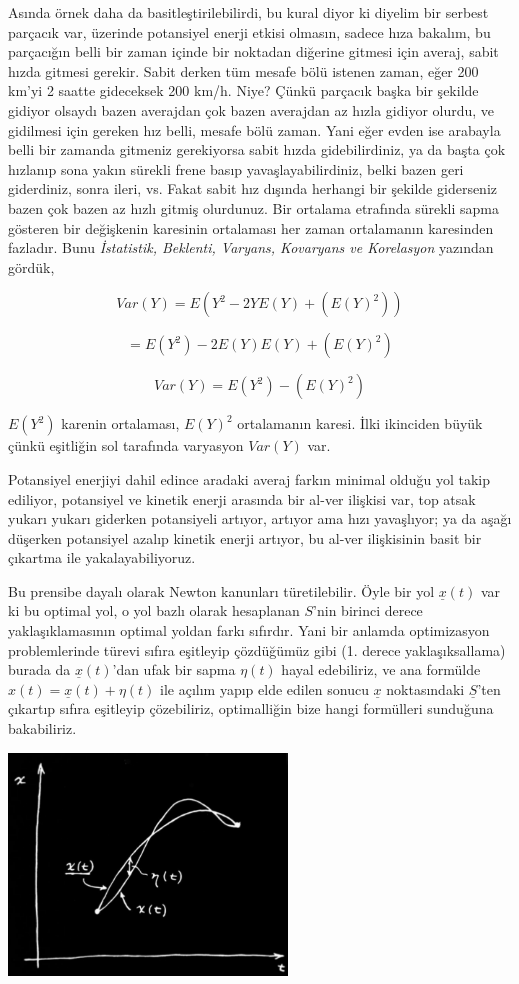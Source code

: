\documentclass[12pt,fleqn]{article}\usepackage{../../common}
\begin{document}
Asında örnek daha da basitleştirilebilirdi, bu kural diyor ki diyelim bir
serbest parçacık var, üzerinde potansiyel enerji etkisi olmasın, sadece
hıza bakalım, bu parçacığın belli bir zaman içinde bir noktadan diğerine
gitmesi için averaj, sabit hızda gitmesi gerekir. Sabit derken tüm mesafe
bölü istenen zaman, eğer 200 km'yi 2 saatte gideceksek 200 km/h. Niye?
Çünkü parçacık başka bir şekilde gidiyor olsaydı bazen averajdan çok bazen
averajdan az hızla gidiyor olurdu, ve gidilmesi için gereken hız belli,
mesafe bölü zaman. Yani eğer evden ise arabayla belli bir zamanda gitmeniz
gerekiyorsa sabit hızda gidebilirdiniz, ya da başta çok hızlanıp sona yakın
sürekli frene basıp yavaşlayabilirdiniz, belki bazen geri giderdiniz, sonra
ileri, vs. Fakat sabit hız dışında herhangi bir şekilde giderseniz bazen
çok bazen az hızlı gitmiş olurdunuz. Bir ortalama etrafında sürekli sapma
gösteren bir değişkenin karesinin ortalaması her zaman ortalamanın
karesinden fazladır. Bunu {\em İstatistik, Beklenti, Varyans, Kovaryans ve
  Korelasyon} yazından gördük,

$$ Var(Y) = E( Y^2  - 2YE(Y) + (E(Y)^2) )$$

$$  = E(Y^2)  - 2E(Y)E(Y) + (E(Y)^2)$$

$$ Var(Y) = E(Y^2) - (E(Y)^2)$$

$E(Y^2)$ karenin ortalaması, $E(Y)^2$ ortalamanın karesi. İlki ikinciden
büyük çünkü eşitliğin sol tarafında varyasyon $Var(Y)$ var. 

Potansiyel enerjiyi dahil edince aradaki averaj farkın minimal olduğu yol
takip ediliyor, potansiyel ve kinetik enerji arasında bir al-ver ilişkisi
var, top atsak yukarı yukarı giderken potansiyeli artıyor, artıyor ama hızı
yavaşlıyor; ya da aşağı düşerken potansiyel azalıp kinetik enerji artıyor,
bu al-ver ilişkisinin basit bir çıkartma ile yakalayabiliyoruz. 

Bu prensibe dayalı olarak Newton kanunları türetilebilir. Öyle bir yol
$\underline{x}(t)$ var ki bu optimal yol, o yol bazlı olarak hesaplanan
$S$'nin birinci derece yaklaşıklamasının optimal yoldan farkı
sıfırdır. Yani bir anlamda optimizasyon problemlerinde türevi sıfıra
eşitleyip çözdüğümüz gibi (1. derece yaklaşıksallama) burada da
$\underline{x}(t)$'dan ufak bir sapma $\eta(t)$ hayal edebiliriz, ve ana
formülde $x(t) = \underline{x}(t) + \eta(t)$ ile açılım yapıp elde edilen
sonucu $\underline{x}$ noktasındaki $\underline{S}$'ten çıkartıp sıfıra
eşitleyip çözebiliriz, optimalliğin bize hangi formülleri sunduğuna
bakabiliriz. 

\includegraphics[width=20em]{phy_lagrange_05.png}
\end{document}
